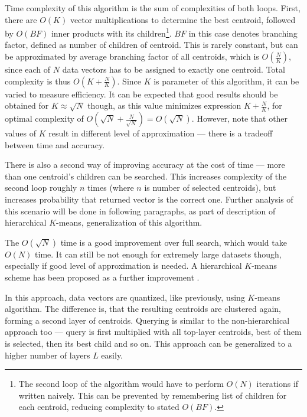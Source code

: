 Time complexity of this algorithm is the sum of complexities of both loops.
First, there are $O(K)$ vector multiplications to determine the best centroid,
followed by $O(BF)$ inner products with its children\footnote{The second loop
of the algorithm would have to perform $O(N)$ iterations if written naively.
This can be prevented by remembering list of children for each centroid,
reducing complexity to stated $O(BF)$.}.
$BF$ in this case denotes
branching factor, defined as number of children of centroid. This is rarely
constant, but can be approximated by average branching factor of all centroids,
which is $O(\frac{N}{K})$, since each of $N$ data vectors has to be assigned
to exactly one centroid. Total complexity is thus $O(K + \frac{N}{K})$. Since
$K$ is parameter of this algorithm, it can be varied to measure efficiency. It
can be expected that good results should be obtained for $K \approx \sqrt{N}$ 
though, as this value minimizes expression $K + \frac{N}{K}$, for optimal
complexity of $O(\sqrt{N} + \frac{N}{\sqrt{N}}) = O(\sqrt{N})$. However, note that other
values of $K$ result in different level of approximation --- there is
a tradeoff between time and accuracy. 

There is also a second way of improving accuracy at the cost of time --- more
than one centroid's children can be searched. This increases complexity of the
second loop roughly $n$ times (where $n$ is number of selected centroids),
but increases probability that returned vector is the correct one. Further
analysis of this scenario will be done in following paragraphs, as part
of description of hierarchical $K$-means, generalization of this algorithm.


\bigskip


The $O(\sqrt{N})$ time is a good improvement over full search, which would
take $O(N)$ time. It can still be not enough for extremely large datasets
though, especially if good level of approximation is needed. A hierarchical
$K$-means scheme has been proposed as a further improvement \cite{kmeans}.

In this approach, data vectors are quantized, like previously,
using $K$-means algorithm.
The difference is, that the resulting centroids are clustered again, forming
a second layer of centroids. Querying is similar to the non-hierarchical
approach too --- query is first multiplied with all top-layer centroids,
best of them is selected, then its best child and
so on. This approach can be generalized to a higher number of layers $L$ 
easily.


